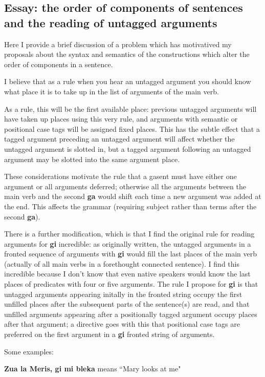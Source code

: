 \documentclass[12pt]{book}
\begin{document}
{\subsection{Essay:  the order of components of sentences and the reading of untagged arguments}

Here I provide a brief discussion of a problem which has motivatived my proposals about the syntax and semantics
of the constructions which alter the order of components in a sentence.

I believe that as a rule when you hear an untagged argument you should know what place it is to take up in the list of arguments of the main verb.

As a rule, this will be the first available place:  previous untagged arguments will have taken up places using this very rule, and arguments with semantic or positional case tags will be assigned fixed places.  This has the subtle effect that
a tagged argument preceding an untagged argument will affect whether the untagged argument is slotted in, but a tagged argument following an untagged argument may be slotted into the same argument place.

These considerations motivate the rule that a gasent must have either one argument or all arguments deferred;
otherwise all the arguments between the main verb and the second {\bf ga} would shift each time a new argument was added at the end.  This affects the grammar (requiring subject rather than terms after the second {\bf ga}).

There is a further modification, which is that I find the original rule for reading arguments for {\bf gi} incredible:  as originally written, the untagged arguments in a fronted sequence of arguments with {\bf gi} would fill the last places of the main verb
(actually of all main verbs in a forethought connected sentence).  I find this incredible because I don't know that even native speakers would know the last places of predicates with four or five arguments.  The rule I propose for {\bf gi} is that  untagged arguments appearing initally in the fronted string occupy the first unfilled places after the subsequent parts of the sentence(s) are read, and that unfilled arguments appearing after a positionally tagged argument occupy places after that argument;  a directive goes with this that positional case tags are preferred on the first argument in a {\bf gi} fronted string of arguments.

Some examples:

{\bf Zua la Meris, gi mi bleka} means ``Mary looks at me"

}
\end{document}
